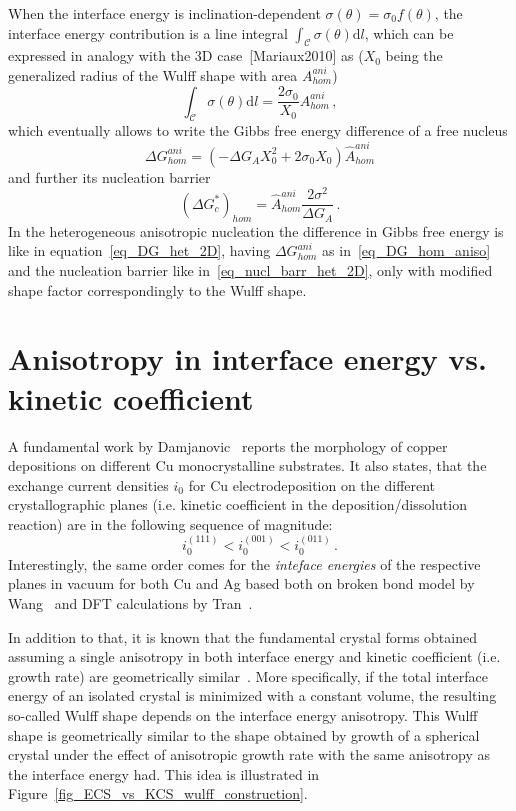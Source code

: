     When the interface energy is inclination-dependent $\sigma(\theta)=\sigma_0 f(\theta)$, the interface energy contribution is a line integral $\int_\mathcal{C} \sigma(\theta) \mathrm{d}l$, which can be expressed in analogy with the 3D case~[Mariaux2010] as ($X_0$ being the generalized radius of the Wulff shape with area $A_{hom}^{ani}$)
    \begin{equation}
        \int_\mathcal{C} \sigma(\theta) \mathrm{d}l = \frac{2\sigma_0}{X_0}A_{hom}^{ani} \,,    
    \end{equation}
    which eventually allows to write the Gibbs free energy difference of a free nucleus
    \begin{equation}\label{eq_DG_hom_aniso}
        \Delta G_{hom}^{ani} = (-\Delta G_A X_0^2 + 2\sigma_0 X_0)\hat{A}_{hom}^{ani} 
    \end{equation}
    and further its nucleation barrier
    \begin{equation} 
        (\Delta G_c^*)_{hom} = \hat{A}_{hom}^{ani}\frac{2\sigma^2}{\Delta G_A}\,.
    \end{equation}
    In the heterogeneous anisotropic nucleation the difference in Gibbs free energy is like in equation~\eqref{eq_DG_het_2D}, having $\Delta G_{hom}^{ani}$ as in~\eqref{eq_DG_hom_aniso} and the nucleation barrier like in~\eqref{eq_nucl_barr_het_2D}, only with modified shape factor correspondingly to the Wulff shape.
    
\section{Anisotropy in interface energy vs. kinetic coefficient}
A fundamental work by Damjanovic~\cite{Damjanovic1966} reports the morphology of copper depositions on different Cu monocrystalline substrates. It also states, that the exchange current densities $i_0$ for Cu electrodeposition on the different crystallographic planes (i.e. kinetic coefficient in the deposition/dissolution reaction) are in the following sequence of magnitude:
\begin{equation}
	i_0^{(111)}<i_0^{(001)}<i_0^{(011)} \,.
\end{equation}
Interestingly, the same order comes for the \textit{inteface energies} of the respective planes in vacuum for both Cu and Ag based both on broken bond model by Wang~\cite{Wang2000} and DFT calculations by Tran~\cite{Tran2016}. 

In addition to that, it is known that the fundamental crystal forms obtained assuming a single anisotropy in both interface energy and kinetic coefficient (i.e. growth rate) are geometrically similar~\cite{Kobayashi2001,Salvalaglio2015}. More specifically, if the total interface energy of an isolated crystal is minimized with a constant volume, the resulting so-called Wulff shape depends on the interface energy anisotropy. This Wulff shape is geometrically similar to the shape obtained by growth of a spherical crystal under the effect of anisotropic growth rate with the same anisotropy as the interface energy had. This idea is illustrated in Figure~\ref{fig_ECS_vs_KCS_wulff_construction}.

